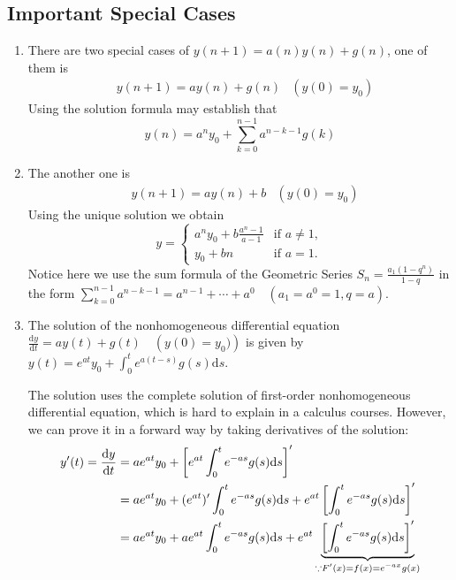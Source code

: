 \subsection{Important Special Cases}
\begin{enumerate}
    \item There are two special cases of $y(n+1)=a(n)y(n)+g(n)$, one of them is
        \begin{align*} & y(n+1)=ay(n)+g(n) & \left(y(0)=y_0\right) \end{align*}
        Using the solution formula may establish that
        \[y(n)=a^ny_0+\sum_{k=0}^{n-1} a^{n-k-1}g(k)\]
    \item The another one is
        \begin{align*} & y(n+1)=ay(n)+b & \left(y(0)=y_0\right) \end{align*}
        Using the unique solution we obtain
        \[
            y= \begin{cases}
                a^ny_0+b\frac{a^n-1}{a-1} & \text{if }a\neq 1, \\
                y_0+bn                    & \text{if }a=1.
            \end{cases}
        \]
        Notice here we use the sum formula of the Geometric Series $S_n=\frac{a_1(1-q^n)}{1-q}$ in the form $\sum_{k=0}^{n-1} a^{n-k-1}=a^{n-1}+\cdots+a^0\quad\left(a_1=a^0=1, q=a\right)$.
    \item The solution of the nonhomogeneous differential equation $\frac{\mathrm{d}y}{\mathrm{d}t}=ay(t)+g(t)\quad\left(y(0)=y_0)\right)$ is given by $y(t)=e^{at}y_0+\int_0^t e^{a(t-s)}g(s)\mathrm{d}s$.
        \begin{explanation}
            The solution uses the complete solution of first-order nonhomogeneous differential equation, which is hard to explain in a calculus courses. However, we can prove it in a forward way by taking derivatives of the solution:
            \begin{align*}
                y^\prime(t)=\frac{\mathrm{d}y}{\mathrm{d}t} & =ae^{at}y_0+\left[e^{at}\int_0^t e^{-as}g(s)\mathrm{d}s\right]^\prime \\
                & =ae^{at}y_0+(e^{at})^\prime\int_0^t e^{-as}g(s)\mathrm{d}s+e^{at}\left[\int_0^t e^{-as}g(s)\mathrm{d}s\right]^\prime \\
                & =ae^{at}y_0+ae^{at}\int_0^t e^{-as}g(s)\mathrm{d}s+e^{at}\underbrace{\left[\int_0^t e^{-as}g(s)\mathrm{d}s\right]^\prime}_{\begin{subarray}{l}
                        \because F^\prime(x)=f(x)=e^{-ax}g(x) \\

\end{subarray}}
\end{align*}
\end{explanation}
\end{enumerate}
